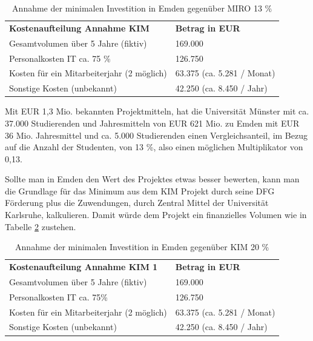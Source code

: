 \begin{table}[h!]
	\begin{tabularx}{\textwidth}{l|l}
		\hline
		\textbf{Kostenaufteilung Annahme KIM} & \textbf{Betrag in EUR}\\
		Gesamtvolumen über 5 Jahre (fiktiv) & 169.000\\
		Personalkosten IT ca. 75 \% & 126.750\\
		Kosten für ein Mitarbeiterjahr (2 möglich) & 63.375 (ca. 5.281 / Monat)\\ 
		Sonstige Kosten (unbekannt) & 42.250 (ca. 8.450 / Jahr)\\
		\hline
	\end{tabularx}
	\caption{Annahme der minimalen Investition in Emden gegenüber MIRO 13 \%}
	\label{tab_kostenaufteilung_emden_MIRO}
\end{table}


Mit EUR 1,3 Mio. bekannten Projektmitteln, hat die Universität Münster mit ca. 37.000 Studierenden und Jahresmitteln von EUR 621 Mio. zu Emden mit EUR 36 Mio. Jahresmittel und ca. 5.000 Studierenden einen Vergleichsanteil, im Bezug auf die Anzahl der Studenten, von 13 \%, also einen möglichen Multiplikator von 0,13.

Sollte man in Emden den Wert des Projektes etwas besser bewerten, kann man die Grundlage für das Minimum aus dem KIM Projekt durch seine DFG Förderung plus die Zuwendungen, durch Zentral Mittel der Universität Karlsruhe, kalkulieren. Damit würde dem Projekt ein finanzielles Volumen wie in Tabelle \ref{tab_kostenaufteilung_emden_KIM1} zustehen.

\begin{table}[h!]
	\begin{tabularx}{\textwidth}{l|l}
		\hline
		\textbf{Kostenaufteilung Annahme KIM 1} & \textbf{Betrag in EUR}\\
		Gesamtvolumen über 5 Jahre (fiktiv) & 169.000\\
		Personalkosten IT ca. 75\% & 126.750\\
		Kosten für ein Mitarbeiterjahr (2 möglich) & 63.375 (ca. 5.281 / Monat)\\ 
		Sonstige Kosten (unbekannt) & 42.250 (ca. 8.450 / Jahr)\\
		\hline
	\end{tabularx}
	\caption{Annahme der minimalen Investition in Emden gegenüber KIM 20 \%}
	\label{tab_kostenaufteilung_emden_KIM1}
\end{table}

